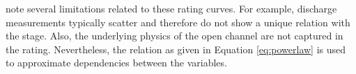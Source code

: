 
\textcite{schmidtStageDischargeRelationshipOpen2011} note several limitations related to these rating curves. For example, discharge measurements typically scatter and therefore do not show a unique relation with the stage. Also, the underlying physics of the open channel are not captured in the rating. Nevertheless, the relation as given in Equation \ref{eq:powerlaw} is used to approximate dependencies between the variables. 




